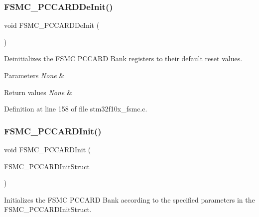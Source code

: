 \subsubsection{\texorpdfstring{F\+S\+M\+C\+\_\+\+P\+C\+C\+A\+R\+D\+De\+Init()}{FSMC\_PCCARDDeInit()}}
{\footnotesize\ttfamily void F\+S\+M\+C\+\_\+\+P\+C\+C\+A\+R\+D\+De\+Init (\begin{DoxyParamCaption}\item[{void}]{ }\end{DoxyParamCaption})}



Deinitializes the F\+S\+MC P\+C\+C\+A\+RD Bank registers to their default reset values. 


\begin{DoxyParams}{Parameters}
{\em None} & \\
\hline
\end{DoxyParams}

\begin{DoxyRetVals}{Return values}
{\em None} & \\
\hline
\end{DoxyRetVals}


Definition at line 158 of file stm32f10x\+\_\+fsmc.\+c.

\mbox{\label{group___f_s_m_c___private___functions_gacee1351363e7700a296faa1734a910aa}} 
\subsubsection{\texorpdfstring{F\+S\+M\+C\+\_\+\+P\+C\+C\+A\+R\+D\+Init()}{FSMC\_PCCARDInit()}}
{\footnotesize\ttfamily void F\+S\+M\+C\+\_\+\+P\+C\+C\+A\+R\+D\+Init (\begin{DoxyParamCaption}\item[{\hyperlink{struct_f_s_m_c___p_c_c_a_r_d_init_type_def}{F\+S\+M\+C\+\_\+\+P\+C\+C\+A\+R\+D\+Init\+Type\+Def} $\ast$}]{F\+S\+M\+C\+\_\+\+P\+C\+C\+A\+R\+D\+Init\+Struct }\end{DoxyParamCaption})}



Initializes the F\+S\+MC P\+C\+C\+A\+RD Bank according to the specified parameters in the F\+S\+M\+C\+\_\+\+P\+C\+C\+A\+R\+D\+Init\+Struct. 


